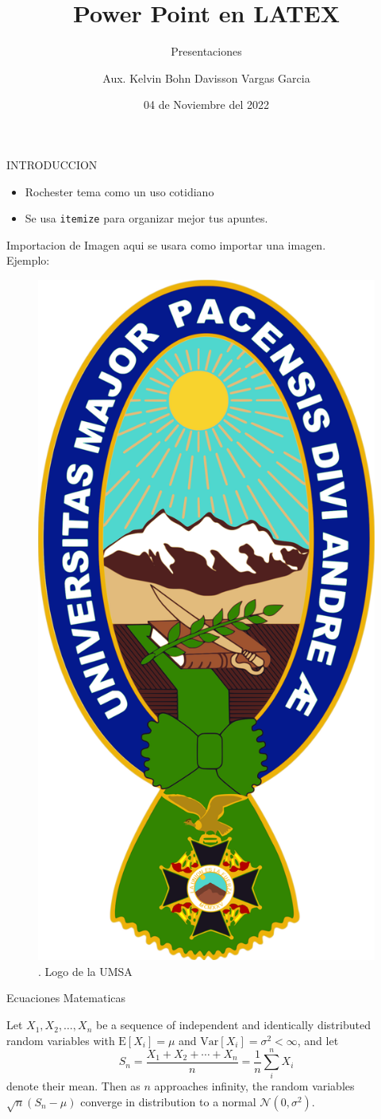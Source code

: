 \documentclass[10pt,xcolor={table,dvipsnames},t]{beamer}
\title[Your Short Title]{Power Point en LATEX}
\subtitle{Presentaciones}
\author{Aux. Kelvin Bohn Davisson Vargas Garcia}
\institute{Facultad de Ciencias Puras y Naturales (UMSA)/La Paz}
\date{04 de Noviembre del 2022}
\begin{document}
\begin{frame}
  \titlepage
\end{frame}

\begin{frame}{INTRODUCCION}

\begin{itemize}
  \item Rochester tema como un uso cotidiano
  \item Se usa \texttt{itemize} para organizar mejor tus apuntes.
\end{itemize}

\begin{block}{Importacion de Imagen}
aqui se usara como importar una imagen.\\
Ejemplo:\\
\begin{figure}[posicion]
\centering
\includegraphics[width=.30\textwidth,height=.50\textheight]{umsa}
\caption{\label{fig:your-figure1}. Logo de la UMSA}
\end{figure}
\end{block}

\end{frame}

\begin{frame}{Ecuaciones Matematicas}

Let $X_1, X_2, \ldots, X_n$ be a sequence of independent and identically distributed random variables with $\text{E}[X_i] = \mu$ and $\text{Var}[X_i] = \sigma^2 < \infty$, and let
$$S_n = \frac{X_1 + X_2 + \cdots + X_n}{n}
      = \frac{1}{n}\sum_{i}^{n} X_i$$
denote their mean. Then as $n$ approaches infinity, the random variables $\sqrt{n}(S_n - \mu)$ converge in distribution to a normal $\mathcal{N}(0, \sigma^2)$.

\end{frame}
\end{document}
